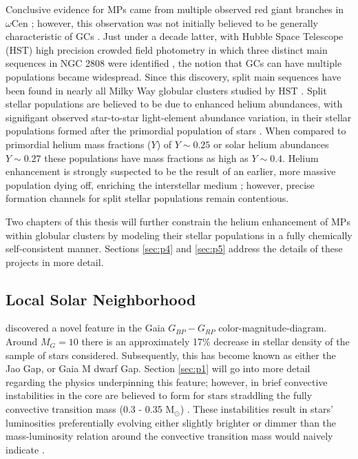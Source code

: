Conclusive evidence for MPs came from multiple observed red giant branches in
$\omega$Cen \citep{Lee1999}; however, this observation was not initially
believed to be generally characteristic of GCs \citep{Gnedin2002}. Just under a decade latter, with
Hubble Space Telescope (HST) high precision crowded field photometry in which
three distinct main sequences in NGC 2808 were identified \citep{Piotto2007},
the notion that GCs can have multiple populations became widespread. Since this
discovery, split main sequences have been found in nearly all Milky Way
globular clusters studied by HST \citep{anderson2009,milone2011}. Split stellar
populations are believed to be due to enhanced helium abundances, with
signifigant observed star-to-star light-element abundance variation, in their
stellar populations formed after the primordial population of stars
\citep{d2005,Piotto2007}. When compared to primordial helium mass fractions
($Y$) of $Y\sim 0.25$ \citep{collaboration2016planck} or solar helium
abundances $Y\sim0.27$ \citep{vinyoles2017new} these populations have mass
fractions as high as $Y\sim 0.4$. Helium enhancement is strongly suspected to
be the result of an earlier, more massive population dying off, enriching the
interstellar medium \citep{Gratton2001, Gratton2004, Gratton2012}; however,
precise formation channels for split stellar populations remain contentious. 

Two chapters of this thesis will further constrain the helium enhancement of
MPs within globular clusters by modeling their stellar populations in a fully
chemically self-consistent manner. Sections \ref{sec:p4} and
\ref{sec:p5} address the details of these projects in more detail.

\subsection{Local Solar Neighborhood}
\citet{Jao2018} discovered a novel feature in the Gaia $G_{BP}-G_{RP}$
color-magnitude-diagram. Around $M_{G}=10$ there is an approximately 17\%
decrease in stellar density of the sample of stars \citeauthor{Jao2018}
considered. Subsequently, this has become known as either the Jao Gap, or Gaia
M dwarf Gap. Section \ref{sec:p1} will go into more detail regarding the
physics underpinning this feature; however, in brief convective instabilities
in the core are believed to form for stars straddling the fully convective
transition mass (0.3 - 0.35 M$_{\odot}$) \citep{Baraffe2018}. These
instabilities result in stars' luminosities preferentially evolving either
slightly brighter or dimmer than the mass-luminosity relation around the
convective transition mass would naively indicate \citep{Jao2020}.

